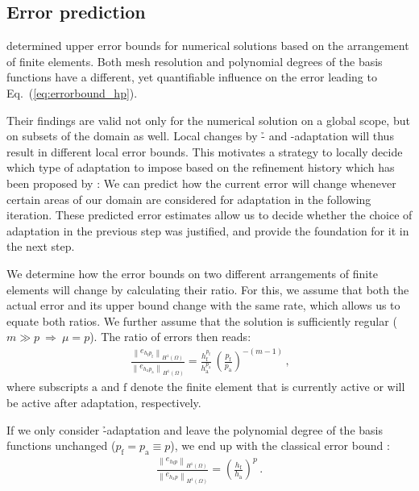 \subsection{Error prediction}
\label{ssec:prediction}

\textcite{babuska1990} determined upper error bounds for numerical solutions based on the arrangement of finite elements. Both mesh resolution and polynomial degrees of the basis functions have a different, yet quantifiable influence on the error leading to Eq.~(\ref{eq:errorbound_hp}).

Their findings are valid not only for the numerical solution on a global scope, but on subsets of the domain as well. Local changes by \h- and \p-adaptation will thus result in different local error bounds. This motivates a strategy to locally decide which type of adaptation to impose based on the refinement history which has been proposed by \textcite{melenk2001}: We can predict how the current error will change whenever certain areas of our domain are considered for adaptation in the following iteration. These predicted error estimates allow us to decide whether the choice of adaptation in the previous step was justified, and provide the foundation for it in the next step.

We determine how the error bounds on two different arrangements of finite elements will change by calculating their ratio. For this, we assume that both the actual error and its upper bound change with the same rate, which allows us to equate both ratios. We further assume that the solution is sufficiently regular ($m \gg p ~\Rightarrow~ \mu = p$). The ratio of errors then reads:
\begin{align}
\label{eq:errorratio_hp} \frac{\left\|e_{h_\text{f} p_\text{f}}\right\|_{H^{1}(\Omega)}}{\left\|e_{h_\text{a} p_\text{a}}\right\|_{H^{1}(\Omega)}} = \frac{h_\text{f}^{p_\text{f}}}{h_\text{a}^{p_\text{a}}} \, \left(\frac{p_\text{f}}{p_\text{a}}\right)^{-(m-1)} \,\text{,}
\end{align}
where subscripts $\text{a}$ and $\text{f}$ denote the finite element that is currently active or will be active after adaptation, respectively.

If we only consider \h-adaptation and leave the polynomial degree of the basis functions unchanged ($p_\text{f} = p_\text{a} \equiv p$), we end up with the classical error bound \parencite{babuska1990}:
\begin{align}
\label{eq:errorratio_h} \frac{\left\|e_{h_\text{f} p}\right\|_{H^{1}(\Omega)}}{\left\|e_{h_\text{a} p}\right\|_{H^{1}(\Omega)}} = \left( \frac{h_\text{f}}{h_\text{a}} \right)^p \,\text{.}
\end{align}

